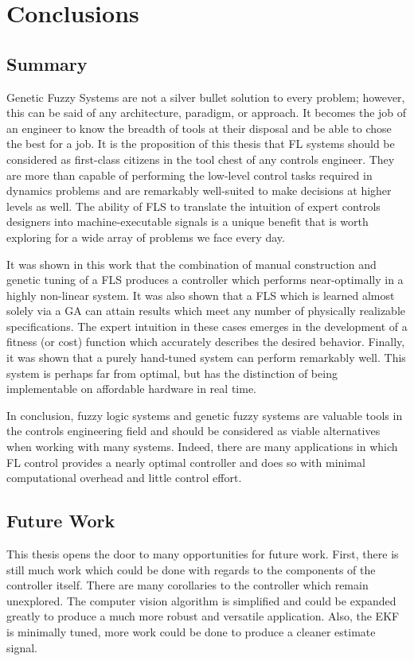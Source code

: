 \chapter{Conclusions}

\section{Summary}
Genetic Fuzzy Systems are not a silver bullet solution to every problem; however, this can be said of any
architecture, paradigm, or approach. It becomes the job of an engineer to know the breadth of tools at their
disposal and be able to chose the best for a job. It is the proposition of this thesis that FL systems should
be considered as first-class citizens in the tool chest of any controls engineer. They are more than capable
of performing the low-level control tasks required in dynamics problems and are remarkably well-suited to make
decisions at higher levels as well. The ability of FLS to translate the intuition of expert controls designers
into machine-executable signals is a unique benefit that is worth exploring for a wide array of problems we
face every day.

It was shown in this work that the combination of manual construction and genetic tuning of a FLS produces a
controller which performs near-optimally in a highly non-linear system. It was also shown that a
FLS which is learned almost solely via a GA can attain results which meet any number of physically realizable
specifications. The expert intuition in these cases emerges in the development of a fitness (or cost) function
which accurately describes the desired behavior. Finally, it was shown that a purely hand-tuned system can
perform remarkably well. This system is perhaps far from optimal, but has the distinction of being
implementable on affordable hardware in real time. 

In conclusion, fuzzy logic systems and genetic fuzzy systems are valuable tools in the controls engineering
field and should be considered as viable alternatives when working with many systems. Indeed, there are many
applications in which FL control provides a nearly optimal controller and does so with minimal computational
overhead and little control effort. 

\section{Future Work}
This thesis opens the door to many opportunities for future work. First, there is still much work which could
be done with regards to the components of the controller itself. There are many corollaries to the controller
which remain unexplored. The computer vision algorithm is simplified and could be expanded greatly to produce
a much more robust and versatile application. Also, the EKF is minimally tuned, more work could be done to
produce a cleaner estimate signal.

